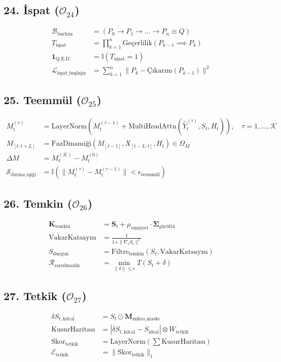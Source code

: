 \documentclass[11pt, a4paper]{article}
\begin{document}
\subsection{24. İspat ($\mathcal{O}_{24}$)}
\begin{align}
\mathcal{B}_{\text{burhân}} &= (P_0 \to P_1 \to \dots \to P_n \equiv Q) \\
T_{\text{ispat}} &= \prod_{k=1}^n \text{Geçerlilik}(P_{k-1} \implies P_k) \\
\mathbf{1}_{\text{Q.E.D.}} &= \mathbb{I}(T_{\text{ispat}} = 1) \\
\mathcal{L}_{\text{ispat\_boşluğu}} &= \sum_{k=1}^n \| P_k - \text{Çıkarım}(P_{k-1}) \|^2
\end{align}

\subsection{25. Teemmül ($\mathcal{O}_{25}$)}
\begin{align}
M_t^{(\tau)} &= \text{LayerNorm}\left( M_t^{(\tau-1)} + \text{MultiHeadAttn}(\hat{Y}_t^{(\tau)}, S_t, H_t) \right), \quad \tau = 1, \dots, \mathcal{K} \\
M_{[t:t+L]} &= \text{FazDinamiği}\left( M_{[t-1]}, X_{[t-L:t]}, H_t \right) \in \Omega_M \\
\Delta M &= M_t^{(\mathcal{K})} - M_t^{(0)} \\
\mathcal{S}_{\text{durma\_eşiği}} &= \mathbb{I}(\|M_t^{(\tau)} - M_t^{(\tau-1)}\| < \epsilon_{\text{teemmül}})
\end{align}

\subsection{26. Temkin ($\mathcal{O}_{26}$)}
\begin{align}
\mathbf{K}_{\text{temkin}} &= \mathbf{S}_t + \mu_{\text{emniyet}} \cdot \mathbf{\Sigma}_{\text{gürültü}} \\
\text{VakarKatsayısı} &= \frac{1}{1 + \|\nabla_t S_t\|^2} \\
S_{\text{durgun}} &= \text{Filtre}_{\text{temkin}}(S_t, \text{VakarKatsayısı}) \\
\mathcal{R}_{\text{sarsılmazlık}} &= \min_{\|\delta\| \le \epsilon} T(S_t + \delta)
\end{align}

\subsection{27. Tetkik ($\mathcal{O}_{27}$)}
\begin{align}
\delta S_{t, \text{kılcal}} &= S_t \odot \mathbf{M}_{\text{mikro\_maske}} \\
\text{KusurHaritası} &= |\delta S_{t, \text{kılcal}} - S_{\text{ideal}}| \otimes W_{\text{tetkik}} \\
\text{Skor}_{\text{tetkik}} &= \text{LayerNorm}\left(\sum \text{KusurHaritası}\right) \\
\mathcal{E}_{\text{tetkik}} &= \| \text{Skor}_{\text{tetkik}} \|_1
\end{align}
\end{document}
